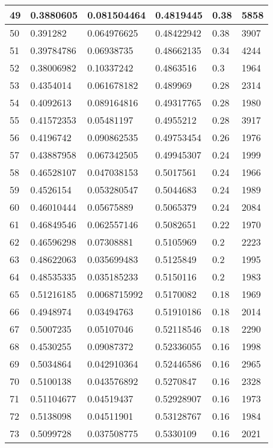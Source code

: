 \begin{longtable}{|l|l|l|l|l|l|}
49 & 0.3880605 & 0.081504464 & 0.4819445 & 0.38 & 5858 \\ \hline 
50 & 0.391282 & 0.064976625 & 0.48422942 & 0.38 & 3907 \\ \hline 
51 & 0.39784786 & 0.06938735 & 0.48662135 & 0.34 & 4244 \\ \hline 
52 & 0.38006982 & 0.10337242 & 0.4863516 & 0.3 & 1964 \\ \hline 
53 & 0.4354014 & 0.061678182 & 0.489969 & 0.28 & 2314 \\ \hline 
54 & 0.4092613 & 0.089164816 & 0.49317765 & 0.28 & 1980 \\ \hline 
55 & 0.41572353 & 0.05481197 & 0.4955212 & 0.28 & 3917 \\ \hline 
56 & 0.4196742 & 0.090862535 & 0.49753454 & 0.26 & 1976 \\ \hline 
57 & 0.43887958 & 0.067342505 & 0.49945307 & 0.24 & 1999 \\ \hline 
58 & 0.46528107 & 0.047038153 & 0.5017561 & 0.24 & 1966 \\ \hline 
59 & 0.4526154 & 0.053280547 & 0.5044683 & 0.24 & 1989 \\ \hline 
60 & 0.46010444 & 0.05675889 & 0.5065379 & 0.24 & 2084 \\ \hline 
61 & 0.46849546 & 0.062557146 & 0.5082651 & 0.22 & 1970 \\ \hline 
62 & 0.46596298 & 0.07308881 & 0.5105969 & 0.2 & 2223 \\ \hline 
63 & 0.48622063 & 0.035699483 & 0.5125849 & 0.2 & 1995 \\ \hline 
64 & 0.48535335 & 0.035185233 & 0.5150116 & 0.2 & 1983 \\ \hline 
65 & 0.51216185 & 0.0068715992 & 0.5170082 & 0.18 & 1969 \\ \hline 
66 & 0.4948974 & 0.03494763 & 0.51910186 & 0.18 & 2014 \\ \hline 
67 & 0.5007235 & 0.05107046 & 0.52118546 & 0.18 & 2290 \\ \hline 
68 & 0.4530255 & 0.09087372 & 0.52336055 & 0.16 & 1998 \\ \hline 
69 & 0.5034864 & 0.042910364 & 0.52446586 & 0.16 & 2965 \\ \hline 
70 & 0.5100138 & 0.043576892 & 0.5270847 & 0.16 & 2328 \\ \hline 
71 & 0.51104677 & 0.04519437 & 0.52928907 & 0.16 & 1973 \\ \hline 
72 & 0.5138098 & 0.04511901 & 0.53128767 & 0.16 & 1984 \\ \hline 
73 & 0.5099728 & 0.037508775 & 0.5330109 & 0.16 & 2021 \\ \hline 

\end{longtable}
